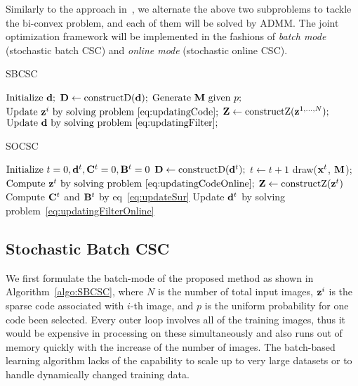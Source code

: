 Similarly to the approach in~\cite{heide2015fast}, we alternate the above two subproblems to tackle the bi-convex problem, and each of them will be solved by ADMM. The joint optimization framework will be implemented in the fashions of {\em batch mode} (stochastic batch CSC) and {\em online mode} (stochastic online CSC).

\begin{minipage}[t]{0.5\textwidth}
\vspace{0pt}
\begin{algorithm}[H]
\caption{SBCSC} \label{algo:SBCSC}
\begin{algorithmic}[1]
\State $\text{Initialize} ~ \filter;$
    \State $\Filter \gets \text{constructD}(\filter);$
        \State $ \text{Generate } \mask \text{ given } p;$
        \State $ \text{Update } \code^i \text{ by solving problem~\ref{eq:updatingCode}};$
    \EndFor
    \State $\Code \gets \text{constructZ}(\code^{1,...,N});$
    \State $\text{Update } \filter \text{ by solving problem~\ref{eq:updatingFilter}} ;$
\EndWhile
\end{algorithmic}
\end{algorithm}
\end{minipage}
\begin{minipage}[t]{0.5\textwidth}
\vspace{0pt}
\begin{algorithm}[H]
\caption{SOCSC} \label{algo:SOCSC}
\begin{algorithmic}[1]
\State $\text{Initialize} ~ t=0, \filter^t,  \surC^t = 0, \surB^t = 0$
    \State $\Filter \gets \text{constructD}(\filter^t);$
    \State $t \gets t+1$
    \State draw($\signal^t$, $\mask$);
    \State $ \text{Compute } \code^t \text{ by solving problem~\ref{eq:updatingCodeOnline}};$
    \State $\Code \gets \text{constructZ}(\code^t)$
    \State Compute $\surC^t$ and $\surB^t$ by eq~\ref{eq:updateSur}
    \State Update $\filter^t$ by solving problem~\ref{eq:updatingFilterOnline}
\EndWhile
\end{algorithmic}
\end{algorithm}
\end{minipage}

\subsection{Stochastic Batch CSC}
We first formulate the batch-mode of the proposed method as shown in Algorithm~\ref{algo:SBCSC}, where $N$ is the number of total input images, $\code^i$ is the sparse code associated with $i$-th image, and $p$ is the uniform probability for one code been selected. Every outer loop involves all of the training images, thus it would be expensive in processing on these simultaneously and also runs out of memory quickly with the increase of the number of images. The batch-based learning algorithm lacks of the capability to scale up to very large datasets or to handle dynamically changed training data.

